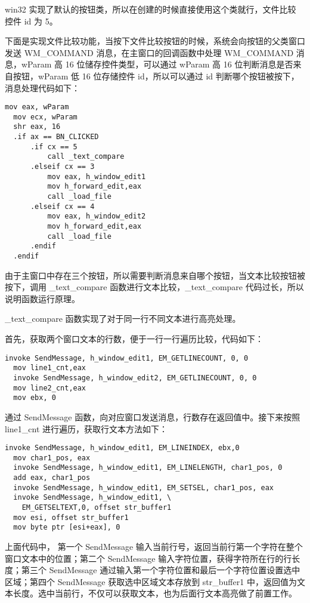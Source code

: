 \documentclass[proposal-report]{bitart}
\begin{document}
win32 实现了默认的按钮类，所以在创建的时候直接使用这个类就行，文件比较 控件 id 为 5。

下面是实现文件比较功能，当按下文件比较按钮的时候，系统会向按钮的父类窗口发送 WM\_COMMAND 消息，在主窗口的回调函数中处理 WM\_COMMAND 消息，wParam 高 16 位储存控件类型，可以通过 wParam 高 16 位判断消息是否来自按钮，wParam 低 16 位存储控件 id，所以可以通过 id 判断哪个按钮被按下，消息处理代码如下：

\begin{lstlisting}[language={[x86masm]Assembler}]
  mov eax, wParam
  mov ecx, wParam
  shr eax, 16
  .if ax == BN_CLICKED
      .if cx == 5
          call _text_compare
      .elseif cx == 3
          mov eax, h_window_edit1 
          mov h_forward_edit,eax 
          call _load_file
      .elseif cx == 4
          mov eax, h_window_edit2
          mov h_forward_edit,eax
          call _load_file
      .endif
  .endif
\end{lstlisting}

由于主窗口中存在三个按钮，所以需要判断消息来自哪个按钮，当文本比较按钮被按下，调用 \_text\_compare 函数进行文本比较，\_text\_compare 代码过长，所以说明函数运行原理。

\_text\_compare 函数实现了对于同一行不同文本进行高亮处理。

首先，获取两个窗口文本的行数，便于一行一行遍历比较，代码如下：

\begin{lstlisting}[language={[x86masm]Assembler}]
  invoke SendMessage, h_window_edit1, EM_GETLINECOUNT, 0, 0
  mov line1_cnt,eax
  invoke SendMessage, h_window_edit2, EM_GETLINECOUNT, 0, 0
  mov line2_cnt,eax
  mov ebx, 0
\end{lstlisting}

通过 SendMessage 函数，向对应窗口发送消息，行数存在返回值中。接下来按照 line1\_cnt 进行遍历，获取行文本方法如下：

\begin{lstlisting}[language={[x86masm]Assembler}]
  invoke SendMessage, h_window_edit1, EM_LINEINDEX, ebx,0
  mov char1_pos, eax
  invoke SendMessage, h_window_edit1, EM_LINELENGTH, char1_pos, 0
  add eax, char1_pos
  invoke SendMessage, h_window_edit1, EM_SETSEL, char1_pos, eax
  invoke SendMessage, h_window_edit1, \
    EM_GETSELTEXT,0, offset str_buffer1
  mov esi, offset str_buffer1
  mov byte ptr [esi+eax], 0
\end{lstlisting}

上面代码中， 第一个 SendMessage 输入当前行号，返回当前行第一个字符在整个窗口文本中的位置；第二个 SendMessage 输入字符位置，获得字符所在行的行长度；第三个 SendMessage 通过输入第一个字符位置和最后一个字符位置设置选中区域；第四个 SendMessage 获取选中区域文本存放到 str\_buffer1 中，返回值为文本长度。选中当前行，不仅可以获取文本，也为后面行文本高亮做了前置工作。
\end{document}
